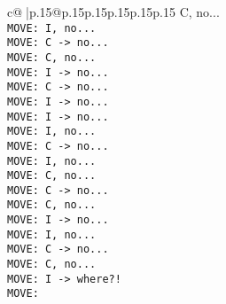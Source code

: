 \documentclass{article}
\begin{document}
{\begin{supertabular}{c@{$\;$}|p{.15\linewidth}@{}p{.15\linewidth}p{.15\linewidth}p{.15\linewidth}p{.15\linewidth}p{.15\linewidth}}
{{{ C, no...\\ \tt  MOVE: I, no...\\ \tt  MOVE: C -> no...\\ \tt  MOVE: C, no...\\ \tt  MOVE: I -> no...\\ \tt  MOVE: C -> no...\\ \tt  MOVE: I -> no...\\ \tt  MOVE: I -> no...\\ \tt  MOVE: I, no...\\ \tt  MOVE: C -> no...\\ \tt  MOVE: I, no...\\ \tt  MOVE: C, no...\\ \tt  MOVE: C -> no...\\ \tt  MOVE: C, no...\\ \tt  MOVE: I -> no...\\ \tt  MOVE: I, no...\\ \tt  MOVE: C -> no...\\ \tt  MOVE: C, no...\\ \tt  MOVE: I -> where?!\\ \tt  MOVE: }}}
\end{supertabular}}
\end{document}
